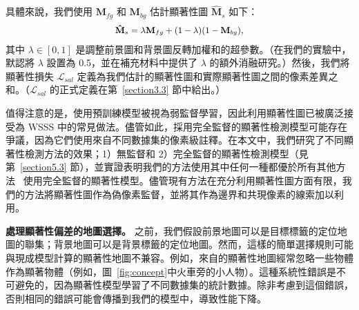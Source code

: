 \documentclass[final]{cvpr}
\begin{document}
具體來說，我們使用 $\mathbf{M}_{fg}$ 和 $\mathbf{M}_{bg}$ 估計顯著性圖 $\mathbf{\hat{M}}_{s}$ 如下：\vspace{-1mm}
\begin{equation}
\label{eq_esimate_sal}
{\small
\begin{split}
\mathbf{\hat{M}}_{s} = \lambda\mathbf{M}_{fg} + (1-\lambda)(1-\mathbf{M}_{bg}),
\end{split}}\vspace{-1mm}
\end{equation}
\noindent 其中 $\lambda \in [0, 1]$ 是調整前景圖和背景圖反轉加權和的超參數。（在我們的實驗中，默認將 $\lambda$ 設置為 0.5，並在補充材料中提供了 $\lambda$ 的額外消融研究。）然後，我們將顯著性損失 $\mathcal{L}_{sal}$ 定義為我們估計的顯著性圖和實際顯著性圖之間的像素差異之和。（$\mathcal{L}_{sal}$ 的正式定義在第~\ref{section3.3} 節中給出。）

值得注意的是，使用預訓練模型被視為弱監督學習，因此利用顯著性圖已被廣泛接受為 WSSS 中的常見做法。儘管如此，採用完全監督的顯著性檢測模型可能存在爭議，因為它們使用來自不同數據集的像素級註釋。在本文中，我們研究了不同顯著性檢測方法的效果；1）無監督和 2）完全監督的顯著性檢測模型（見第~\ref{section5.3} 節），並實證表明我們的方法使用其中任何一種都優於所有其他方法~\cite{fan2020learning,jiang2019integral,wang2018weakly, wei2016stc,yao2020saliency} 使用完全監督的顯著性模型。儘管現有方法在充分利用顯著性圖方面有限，我們的方法將顯著性圖作為偽像素監督，並將其作為邊界和共現像素的線索加以利用。

\vspace{1mm}
\noindent\textbf{處理顯著性偏差的地圖選擇。} 之前，我們假設前景地圖可以是目標標籤的定位地圖的聯集；背景地圖可以是背景標籤的定位地圖。然而，這樣的簡單選擇規則可能與現成模型計算的顯著性地圖不兼容。例如，來自\cite{zhao2019pyramid}的顯著性地圖經常忽略一些物體作為顯著物體（例如，圖~\ref{fig:concept}中火車旁的小人物）。這種系統性錯誤是不可避免的，因為顯著性模型學習了不同數據集的統計數據。除非考慮到這個錯誤，否則相同的錯誤可能會傳播到我們的模型中，導致性能下降。
\end{document}
